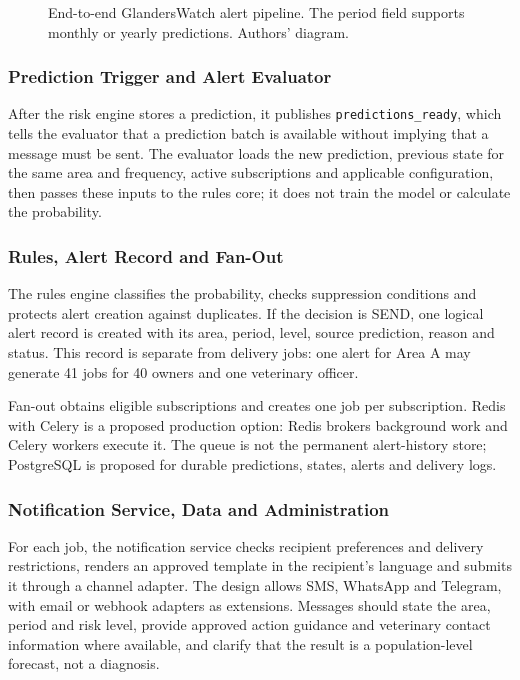 \documentclass[10pt,openany]{report}
\begin{document}
\begin{figure}[htbp]\centering
\resizebox{\textwidth}{!}{}
\caption[End-to-end GlandersWatch alert pipeline]{End-to-end GlandersWatch alert pipeline. The period field supports monthly or yearly predictions. Authors' diagram.}\label{fig:alerts-pipeline}
\end{figure}

\subsubsection{Prediction Trigger and Alert Evaluator}
After the risk engine stores a prediction, it publishes \texttt{predictions\_ready}, which tells the evaluator that a prediction batch is available without implying that a message must be sent. The evaluator loads the new prediction, previous state for the same area and frequency, active subscriptions and applicable configuration, then passes these inputs to the rules core; it does not train the model or calculate the probability.

\subsubsection{Rules, Alert Record and Fan-Out}
The rules engine classifies the probability, checks suppression conditions and protects alert creation against duplicates. If the decision is SEND, one logical alert record is created with its area, period, level, source prediction, reason and status. This record is separate from delivery jobs: one alert for Area A may generate 41 jobs for 40 owners and one veterinary officer.

Fan-out obtains eligible subscriptions and creates one job per subscription. Redis with Celery is a proposed production option: Redis brokers background work and Celery workers execute it. The queue is not the permanent alert-history store; PostgreSQL is proposed for durable predictions, states, alerts and delivery logs.

\subsubsection{Notification Service, Data and Administration}
For each job, the notification service checks recipient preferences and delivery restrictions, renders an approved template in the recipient's language and submits it through a channel adapter. The design allows SMS, WhatsApp and Telegram, with email or webhook adapters as extensions. Messages should state the area, period and risk level, provide approved action guidance and veterinary contact information where available, and clarify that the result is a population-level forecast, not a diagnosis.
\end{document}
